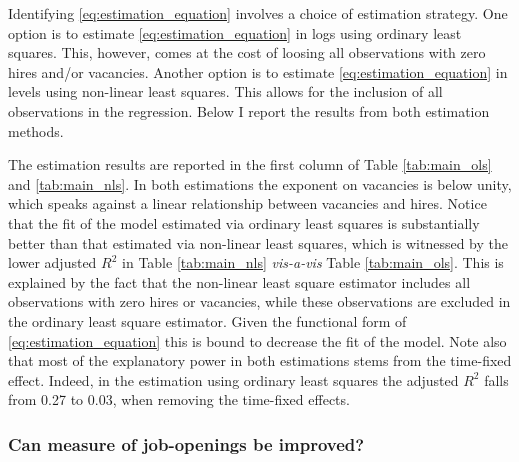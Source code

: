 Identifying \eqref{eq:estimation_equation} involves a choice of estimation strategy. One option is to estimate \eqref{eq:estimation_equation} in logs using ordinary least squares. This, however, comes at the cost of loosing all observations with zero hires and/or vacancies. Another option is to estimate \eqref{eq:estimation_equation} in levels using non-linear least squares. This allows for the inclusion of all observations in the regression. Below I report the results from both estimation methods. %

The estimation results are reported in the first column of Table \ref{tab:main_ols} and \ref{tab:main_nls}. In both estimations the exponent on vacancies is below unity, which speaks against a linear relationship between vacancies and hires. Notice that the fit of the model estimated via ordinary least squares is substantially better than that estimated via non-linear least squares, which is witnessed by the lower adjusted $R^2$ in Table \ref{tab:main_nls} \emph{vis-a-vis} Table \ref{tab:main_ols}. This is explained by the fact that the non-linear least square estimator includes all observations with zero hires or vacancies, while these observations are excluded in the ordinary least square estimator. Given the functional form of \eqref{eq:estimation_equation} this is bound to decrease the fit of the model. Note also that most of the explanatory power in both estimations stems from the time-fixed effect. Indeed, in the estimation using ordinary least squares the adjusted $R^2$ falls from 0.27 to 0.03, when removing the time-fixed effects. 



%





%




%

%

 
\subsubsection{Can measure of job-openings be improved?}

